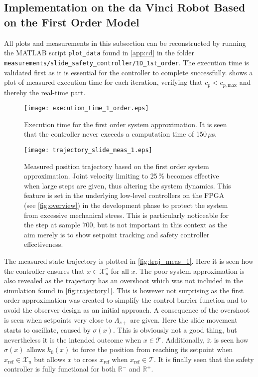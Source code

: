 \subsection{Implementation on the da Vinci Robot Based on the First Order Model}\label{subsec:implement-davinci-1d}
All plots and measurements in this subsection can be reconstructed by running the MATLAB script \texttt{plot\_data} found in \autoref{app:cd} in the folder \texttt{measurements/slide\_safety\_controller/1D\_1st\_order}. The execution time is validated first as it is essential for the controller to complete successfully.  shows a plot of measured execution time for each iteration, verifying that $c_p < c_{p,\text{max}}$ and thereby the real-time part.
\begin{figure}[H]
	\center
		\texttt{[image: execution\_time\_1\_order.eps]}
	\caption{Execution time for the first order system approximation. It is seen that the controller never exceeds a computation time of 150\,$\mu$s.}
	\label{fig:exe_1}
\end{figure}



\begin{figure}[htbp]
\hspace{-7mm}
		\texttt{[image: trajectory\_slide\_meas\_1.eps]}
	\caption{Measured position trajectory based on the first order system approximation. Joint velocity limiting to 25\,\% becomes effective when large steps are given, thus altering the system dynamics. This feature is set in the underlying low-level controllers on the FPGA (see \autoref{fig:overview}) in the development phase to protect the system from excessive mechanical stress. This is particularly noticeable for the step at sample 700, but is not important in this context as the aim merely is to show setpoint tracking and safety controller effectiveness.}
    \label{fig:traj_meas_1}
\end{figure}
The measured state trajectory is plotted in \autoref{fig:traj_meas_1}.
Here it is seen how the controller ensures that $x \in \mathcal{X}_u^c$ for all $x$. The poor system approximation is also revealed as the trajectory has an overshoot which was not included in the simulation found in \autoref{fig:trajectory1}. This is however not surprising as the first order approximation was created to simplify the control barrier function and to avoid the observer design as an initial approach. A consequence of the overshoot is seen when setpoints very close to $\Lambda_{s+}$ are given. Here the slide movement starts to oscillate, caused by $\sigma(x)$. This is obviously not a good thing, but nevertheless it is the intended outcome when $x \in \mathcal{T}$. Additionally, it is seen how $\sigma(x)$ allows $k_0(x)$ to force the position from reaching its setpoint when $x_\text{ref} \in \mathcal{X}_u$ but allows $x$ to cross $x_\text{ref}$ when $x_\text{ref} \in \mathcal{T}$. %
It is finally seen that the safety controller is fully functional for both $\mathbb{R}^-$ and $\mathbb{R}^+$.

